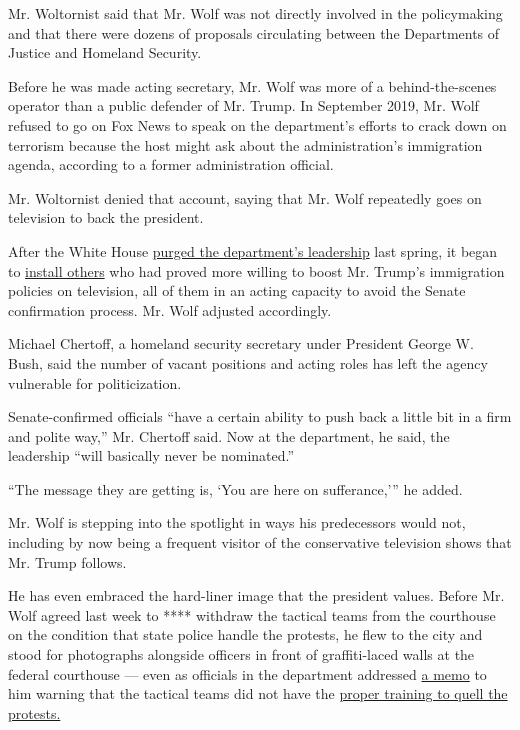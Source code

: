Mr. Woltornist said that Mr. Wolf was not directly involved in the
policymaking and that there were dozens of proposals circulating between
the Departments of Justice and Homeland Security.

Before he was made acting secretary, Mr. Wolf was more of a
behind-the-scenes operator than a public defender of Mr. Trump. In
September 2019, Mr. Wolf refused to go on Fox News to speak on the
department's efforts to crack down on terrorism because the host might
ask about the administration's immigration agenda, according to a former
administration official.

Mr. Woltornist denied that account, saying that Mr. Wolf repeatedly goes
on television to back the president.

After the White House
\href{https://www.nytimes3xbfgragh.onion/2019/04/08/us/politics/randolph-alles-secret-service.html}{purged
the department's leadership} last spring, it began to
\href{https://www.nytimes3xbfgragh.onion/2019/09/05/us/politics/ken-cuccinelli-immigration-trump.html}{install
others} who had proved more willing to boost Mr. Trump's immigration
policies on television, all of them in an acting capacity to avoid the
Senate confirmation process. Mr. Wolf adjusted accordingly.

Michael Chertoff, a homeland security secretary under President George
W. Bush, said the number of vacant positions and acting roles has left
the agency vulnerable for politicization.

Senate-confirmed officials ``have a certain ability to push back a
little bit in a firm and polite way,'' Mr. Chertoff said. Now at the
department, he said, the leadership ``will basically never be
nominated.''

``The message they are getting is, `You are here on sufferance,''' he
added.

Mr. Wolf is stepping into the spotlight in ways his predecessors would
not, including by now being a frequent visitor of the conservative
television shows that Mr. Trump follows.

He has even embraced the hard-liner image that the president values.
Before Mr. Wolf agreed last week to **** withdraw the tactical teams
from the courthouse on the condition that state police handle the
protests, he flew to the city and stood for photographs alongside
officers in front of graffiti-laced walls at the federal courthouse ---
even as officials in the department addressed
\href{https://int.graylady3jvrrxbe.onion/data/documenttools/dh-stacticalagent-memo1/d490e392eab7d7d6/full.pdf}{a
memo} to him warning that the tactical teams did not have the
\href{https://www.nytimes3xbfgragh.onion/2020/07/18/us/portland-protests.html}{proper
training to quell the protests.}

